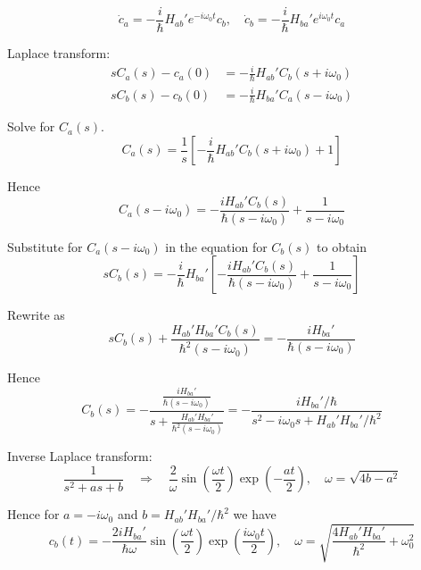 


\begin{equation*}
\dot c_a=-\frac{i}{\hbar}H_{ab}'e^{-i\omega_0t}c_b,\quad
\dot c_b=-\frac{i}{\hbar}H_{ba}'e^{i\omega_0t}c_a
\tag{11.17}
\end{equation*}

Laplace transform:
\begin{align*}
sC_a(s)-c_a(0)&=-\frac{i}{\hbar}H_{ab}'C_b(s+i\omega_0)
\\
sC_b(s)-c_b(0)&=-\frac{i}{\hbar}H_{ba}'C_a(s-i\omega_0)
\end{align*}

Solve for $C_a(s)$.
\begin{equation*}
C_a(s)=\frac{1}{s}\left[-\frac{i}{\hbar}H_{ab}'C_b(s+i\omega_0)+1\right]
\end{equation*}

Hence
\begin{equation*}
C_a(s-i\omega_0)=-\frac{iH_{ab}'C_b(s)}{\hbar(s-i\omega_0)}+\frac{1}{s-i\omega_0}
\end{equation*}

Substitute for $C_a(s-i\omega_0)$ in the equation for $C_b(s)$ to obtain
\begin{equation*}
sC_b(s)=-\frac{i}{\hbar}H_{ba}'\left[-\frac{iH_{ab}'C_b(s)}{\hbar(s-i\omega_0)}+\frac{1}{s-i\omega_0}\right]
\end{equation*}

Rewrite as
\begin{equation*}
sC_b(s)+\frac{H_{ab}'H_{ba}'C_b(s)}{\hbar^2(s-i\omega_0)}=-\frac{iH_{ba}'}{\hbar(s-i\omega_0)}
\end{equation*}

Hence
\begin{equation*}
C_b(s)=-\frac
{\displaystyle\frac{iH_{ba}'}{\hbar(s-i\omega_0)}}
{\displaystyle s+\frac{H_{ab}'H_{ba}'}{\hbar^2(s-i\omega_0)}}
=-\frac{iH_{ba}'/\hbar}{s^2-i\omega_0s+H_{ab}'H_{ba}'/\hbar^2}
\end{equation*}

Inverse Laplace transform:
\begin{equation*}
\frac{1}{s^2+as+b}\quad\Rightarrow\quad
\frac{2}{\omega}\sin\left(\frac{\omega t}{2}\right)\exp\left(-\frac{at}{2}\right),\quad
\omega=\sqrt{4b-a^2}
\end{equation*}

Hence for $a=-i\omega_0$ and $b=H_{ab}'H_{ba}'/\hbar^2$ we have
\begin{equation*}
c_b(t)=-\frac{2iH_{ba}'}{\hbar\omega}
\sin\left(\frac{\omega t}{2}\right)
\exp\left(\frac{i\omega_0t}{2}\right),\quad
\omega=\sqrt{\frac{4H_{ab}'H_{ba}'}{\hbar^2}+\omega_0^2}
\end{equation*}


